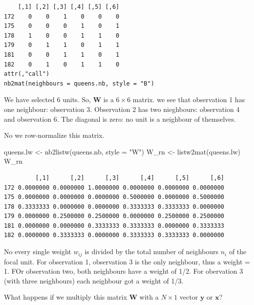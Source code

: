 \documentclass[
  letterpaper,
  DIV=11,
  numbers=noendperiod]{scrreprt}
\newenvironment{Shaded}{\begin{snugshade}}{\end{snugshade}}
\newcommand{\AttributeTok}[1]{\textcolor[rgb]{0.40,0.45,0.13}{#1}}
\newcommand{\FunctionTok}[1]{\textcolor[rgb]{0.28,0.35,0.67}{#1}}
\newcommand{\NormalTok}[1]{\textcolor[rgb]{0.00,0.23,0.31}{#1}}
\newcommand{\OtherTok}[1]{\textcolor[rgb]{0.00,0.23,0.31}{#1}}
\newcommand{\StringTok}[1]{\textcolor[rgb]{0.13,0.47,0.30}{#1}}
\begin{document}
\begin{verbatim}
    [,1] [,2] [,3] [,4] [,5] [,6]
172    0    0    1    0    0    0
175    0    0    0    1    0    1
178    1    0    0    1    1    0
179    0    1    1    0    1    1
181    0    0    1    1    0    1
182    0    1    0    1    1    0
attr(,"call")
nb2mat(neighbours = queens.nb, style = "B")
\end{verbatim}

We have selected 6 units. So, \(\boldsymbol{\mathbf{W}}\) is a
\(6 \times 6\) matrix. we see that observation 1 has one neighbour:
observation 3. Observation 2 has two nieghbours: observation 4 and
observation 6. The diagonal is zero: no unit is a neighbour of
themselves.

No we row-normalize this matrix.

\begin{Shaded}
\begin{Highlighting}[]
\NormalTok{queens.lw }\OtherTok{\textless{}{-}} \FunctionTok{nb2listw}\NormalTok{(queens.nb,}
                      \AttributeTok{style =} \StringTok{"W"}\NormalTok{)}
\NormalTok{W\_rn }\OtherTok{\textless{}{-}} \FunctionTok{listw2mat}\NormalTok{(queens.lw)}
\NormalTok{W\_rn}
\end{Highlighting}
\end{Shaded}

\begin{verbatim}
         [,1]      [,2]      [,3]      [,4]      [,5]      [,6]
172 0.0000000 0.0000000 1.0000000 0.0000000 0.0000000 0.0000000
175 0.0000000 0.0000000 0.0000000 0.5000000 0.0000000 0.5000000
178 0.3333333 0.0000000 0.0000000 0.3333333 0.3333333 0.0000000
179 0.0000000 0.2500000 0.2500000 0.0000000 0.2500000 0.2500000
181 0.0000000 0.0000000 0.3333333 0.3333333 0.0000000 0.3333333
182 0.0000000 0.3333333 0.0000000 0.3333333 0.3333333 0.0000000
\end{verbatim}

No every single weight \(w_{ij}\) is divided by the total number of
neighbours \(n_i\) of the focal unit. For observation 1, observation 3
is the only neighbour, thus a weight = 1. FOr observation two, both
neighbours have a weight of 1/2. For obervation 3 (with three
neighbours) each neighbour got a weight of 1/3.

\begin{tcolorbox}[enhanced jigsaw, opacitybacktitle=0.6, left=2mm, leftrule=.75mm, toptitle=1mm, breakable, colback=white, bottomrule=.15mm, colframe=quarto-callout-tip-color-frame, colbacktitle=quarto-callout-tip-color!10!white, coltitle=black, bottomtitle=1mm, titlerule=0mm, title=\textcolor{quarto-callout-tip-color}{\faLightbulb}\hspace{0.5em}{Question}, opacityback=0, arc=.35mm, rightrule=.15mm, toprule=.15mm]

What happens if we multiply this matrix \(\boldsymbol{\mathbf{W}}\) with
a \(N \times 1\) vector \(\boldsymbol{\mathbf{y}}\) or
\(\boldsymbol{\mathbf{x}}\)?

\end{tcolorbox}
\end{document}
